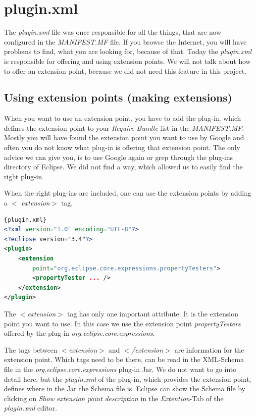 \documentclass[a4paper,10pt]{report}
\begin{document}
\section{plugin.xml}
The {\it plugin.xml} file was once responsible for all the things, that are now configured in the {\it MANIFEST.MF} file.
If you browse the Internet, you will have problems to find, what you are looking for, because of that.
Today the {\it plugin.xml} is responsible for offering and using extension points.
We will not talk about how to offer an extension point, because we did not need this feature in this project.

\subsection{Using extension points (making extensions)}
When you want to use an extension point, you have to add the plug-in, which defines the extension point to your {\it Require-Bundle} list in the {\it MANIFEST.MF}.
Mostly you will have found the extension point you want to use by Google and often you do not know what plug-in is offering that extension point.
The only advice we can give you, is to use Google again or grep through the plug-ins directory of Eclipse.
We did not find a way, which allowed us to easily find the right plug-in.

When the right plug-ins are included, one can use the extension points by adding a {\it $<$ extension$>$} tag.
\begin{lstlisting}[language=XML,caption=Use extension point ({\it plugin.xml})]{plugin.xml}
<?xml version="1.0" encoding="UTF-8"?>
<?eclipse version="3.4"?>
<plugin>
 	<extension 
	    point="org.eclipse.core.expressions.propertyTesters">
   		<propertyTester ... />
 	</extension>
</plugin>
\end{lstlisting}

The {\it $<$extension$>$} tag has only one important attribute. It is the extension point you want to use.
In this case we use the extension point {\it propertyTesters} offered by the plug-in {\it org.eclipse.core.expressions}.

The tags between {\it $<$extension$>$} and {\it $<$/extension$>$} are information for the extension point.
Which tags need to be there, can be read in the XML-Schema file in the {\it org.eclipse.core.expressions} plug-in Jar.
We do not want to go into detail here, but the {\it plugin.xml} of the plug-in, which provides the extension point, defines where in the Jar the Schema file is.
Eclipse can show the Schema file by clicking on {\it Show extension point description} in the {\it Extention}-Tab of the {\it plugin.xml} editor.
\end{document}
